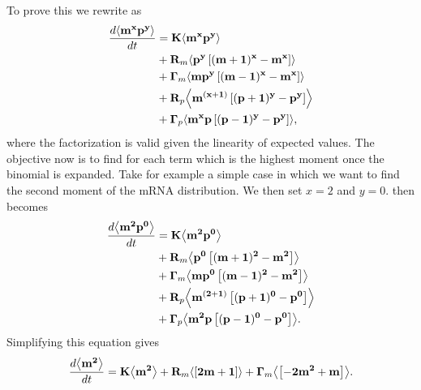 To prove this we rewrite  as
\begin{equation}
  \begin{aligned}
    {d{\mathbf{\left\langle m^x p^y \right\rangle}} \over dt} &=
    \mathbf{K} \mathbf{\left\langle m^x p^y \right\rangle}\\
    &+ \mathbf{R}_m \mathbf{\left\langle p^y \left[ (m + 1)^x -m^x \right] \right\rangle}\\
    &+ \mathbf{\Gamma}_m \mathbf{\left\langle m p^y \left[ (m - 1)^x - m^x \right] \right\rangle}\\
    &+ \mathbf{R}_p \mathbf{\left\langle m^{(x + 1)} \left[ (p + 1)^y - p^y \right] \right\rangle}\\
    &+ \mathbf{\Gamma}_p \mathbf{\left\langle m^x p \left[ (p - 1)^y - p^y \right] \right\rangle},
    \label{seq_mom_ode_factorized}
  \end{aligned}
\end{equation}
where the factorization is valid given the linearity of expected values. The
objective now is to find for each term which is the highest moment once the
binomial is expanded. Take for example a simple case in which we want to find
the second moment of the mRNA distribution. We then set $x = 2$ and $y = 0$.
 then becomes
\begin{equation}
  \begin{aligned}
    {d{\mathbf{\left\langle m^2 p^0 \right\rangle}} \over dt} &=
    \mathbf{K} \mathbf{\left\langle m^2 p^0 \right\rangle}\\
    &+ \mathbf{R}_m \mathbf{\left\langle p^0 \left[ (m + 1)^2 - m^2 \right] \right\rangle}\\
    &+ \mathbf{\Gamma}_m \mathbf{\left\langle m p^0 \left[ (m - 1)^2 - m^2 \right] \right\rangle}\\
    &+ \mathbf{R}_p \mathbf{\left\langle m^{(2 + 1)} \left[ (p + 1)^0 - p^0 \right] \right\rangle}\\
    &+ \mathbf{\Gamma}_p \mathbf{\left\langle m^2 p \left[ (p - 1)^0 - p^0 \right] \right\rangle}.
  \end{aligned}
\end{equation}
Simplifying this equation gives
\begin{equation}
    {d{\mathbf{\left\langle m^2 \right\rangle}} \over dt} =
    \mathbf{K} \mathbf{\left\langle m^2 \right\rangle}
    + \mathbf{R}_m \mathbf{\left\langle \left[ 2m + 1 \right] \right\rangle}
    + \mathbf{\Gamma}_m \mathbf{\left\langle \left[- 2m^2 + m \right] \right\rangle}.
    \label{seq_second_mom_mRNA}
\end{equation}

